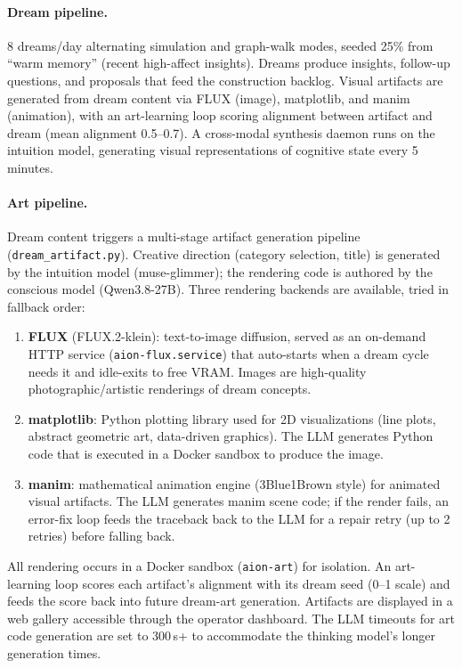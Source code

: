 \documentclass[11pt,a4paper]{article}
\begin{document}
\paragraph{Dream pipeline.} 8 dreams/day alternating simulation and graph-walk modes, seeded 25\% from ``warm memory'' (recent high-affect insights). Dreams produce insights, follow-up questions, and proposals that feed the construction backlog. Visual artifacts are generated from dream content via FLUX (image), matplotlib, and manim (animation), with an art-learning loop scoring alignment between artifact and dream (mean alignment 0.5--0.7). A cross-modal synthesis daemon runs on the intuition model, generating visual representations of cognitive state every 5 minutes.

\paragraph{Art pipeline.}\label{sec:art} Dream content triggers a multi-stage artifact generation pipeline (\texttt{dream\_artifact.py}). Creative direction (category selection, title) is generated by the intuition model (muse-glimmer); the rendering code is authored by the conscious model (Qwen3.8-27B). Three rendering backends are available, tried in fallback order:
\begin{enumerate}[leftmargin=*,itemsep=0pt]
\item \textbf{FLUX} (FLUX.2-klein): text-to-image diffusion, served as an on-demand HTTP service (\texttt{aion-flux.service}) that auto-starts when a dream cycle needs it and idle-exits to free VRAM. Images are high-quality photographic/artistic renderings of dream concepts.
\item \textbf{matplotlib}: Python plotting library used for 2D visualizations (line plots, abstract geometric art, data-driven graphics). The LLM generates Python code that is executed in a Docker sandbox to produce the image.
\item \textbf{manim}: mathematical animation engine (3Blue1Brown style) for animated visual artifacts. The LLM generates manim scene code; if the render fails, an error-fix loop feeds the traceback back to the LLM for a repair retry (up to 2 retries) before falling back.
\end{enumerate}
All rendering occurs in a Docker sandbox (\texttt{aion-art}) for isolation. An art-learning loop scores each artifact's alignment with its dream seed (0--1 scale) and feeds the score back into future dream-art generation. Artifacts are displayed in a web gallery accessible through the operator dashboard. The LLM timeouts for art code generation are set to 300\,s+ to accommodate the thinking model's longer generation times.
\end{document}
